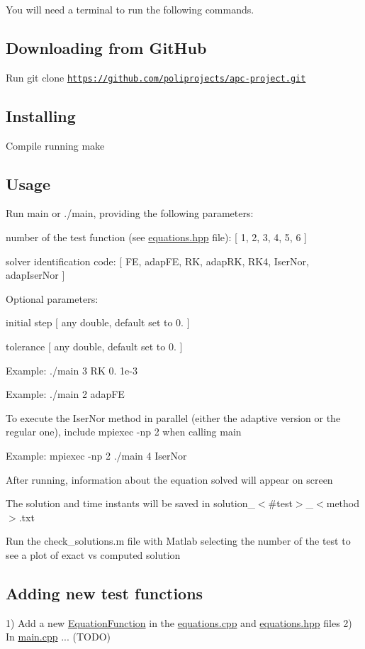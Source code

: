You will need a terminal to run the following commands.

\subsection*{Downloading from Git\+Hub}

Run {\ttfamily git clone \href{https://github.com/poliprojects/apc-project.git}{\tt https\+://github.\+com/poliprojects/apc-\/project.\+git}}

\subsection*{Installing}

Compile running {\ttfamily make}

\subsection*{Usage}


\begin{DoxyItemize}
\item Run {\ttfamily main} or {\ttfamily ./main}, providing the following parameters\+:
\begin{DoxyItemize}
\item number of the test function (see {\ttfamily \hyperlink{equations_8hpp}{equations.\+hpp}} file)\+: \mbox{[} 1, 2, 3, 4, 5, 6 \mbox{]}
\item solver identification code\+: \mbox{[} FE, adap\+FE, RK, adap\+RK, R\+K4, Iser\+Nor, adap\+Iser\+Nor \mbox{]}
\end{DoxyItemize}
\item Optional parameters\+:
\begin{DoxyItemize}
\item initial step \mbox{[} any double, default set to 0. \mbox{]}
\item tolerance \mbox{[} any double, default set to 0. \mbox{]}
\end{DoxyItemize}
\item Example\+: {\ttfamily ./main 3 RK 0. 1e-\/3}
\item Example\+: {\ttfamily ./main 2 adap\+FE}
\item To execute the Iser\+Nor method in parallel (either the adaptive version or the regular one), include {\ttfamily mpiexec -\/np 2} when calling main
\item Example\+: {\ttfamily mpiexec -\/np 2 ./main 4 Iser\+Nor}
\item After running, information about the equation solved will appear on screen
\item The solution and time instants will be saved in solution\+\_\+$<$\#test$>$\+\_\+$<$method$>$.\+txt
\item Run the {\ttfamily check\+\_\+solutions.\+m} file with Matlab selecting the number of the test to see a plot of exact vs computed solution
\end{DoxyItemize}

\subsection*{Adding new test functions}

1) Add a new \hyperlink{structEquationFunction}{Equation\+Function} in the {\ttfamily \hyperlink{equations_8cpp}{equations.\+cpp}} and {\ttfamily \hyperlink{equations_8hpp}{equations.\+hpp}} files 2) In \hyperlink{main_8cpp}{main.\+cpp} ... (T\+O\+DO) 